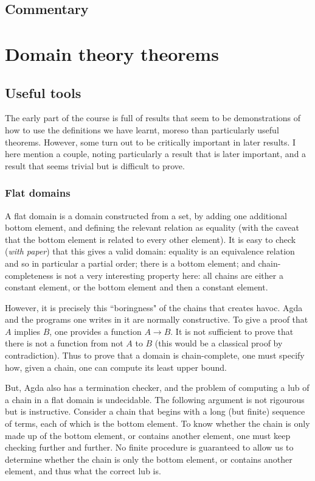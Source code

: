 \documentclass[12pt,a4paper,twoside,openright]{report}
\begin{document}
\subsection{Commentary}
\section{Domain theory theorems}
\subsection{Useful tools}
The early part of the course is full of results that seem to be demonstrations of how to use the definitions we have learnt, moreso than particularly useful theorems. However, some turn out to be critically important in later results. I here mention a couple, noting particularly a result that is later important, and a result that seems trivial but is difficult to prove. 
\subsubsection{Flat domains}
A flat domain is a domain constructed from a set, by adding one additional bottom element, and defining the relevant relation as equality (with the caveat that the bottom element is related to every other element). It is easy to check (\textit{with paper}) that this gives a valid domain: equality is an equivalence relation and so in particular a partial order; there is a bottom element; and chain-completeness is not a very interesting property here: all chains are either a constant element, or the bottom element and then a constant element.

However, it is precisely this ``boringness" of the chains that creates havoc. Agda and the programs one writes in it are normally constructive. To give a proof that $A$ implies $B$, one provides a function $A \to B$. It is not sufficient to prove that there is not a function from not $A$ to $B$ (this would be a classical proof by contradiction). Thus to prove that a domain is chain-complete, one must specify how, given a chain, one can compute its least upper bound. 

But, Agda also has a termination checker, and the problem of computing a lub of a chain in a flat domain is undecidable. The following argument is not rigourous but is instructive. Consider a chain that begins with a long (but finite) sequence of terms, each of which is the bottom element. To know whether the chain is only made up of the bottom element, or contains another element, one must keep checking further and further. No finite procedure is guaranteed to allow us to determine whether the chain is only the bottom element, or contains another element, and thus what the correct lub is. 
\end{document}
